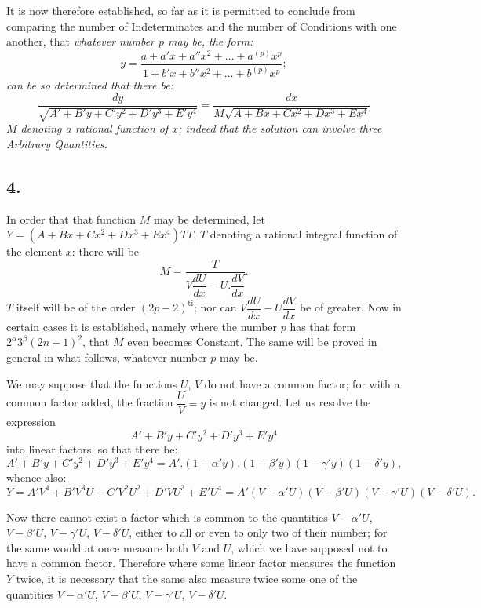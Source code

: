 \documentclass{article}
\begin{document}
It is now therefore established, so far as it is permitted to conclude from comparing the number of Indeterminates and the number of Conditions with one another, that \emph{whatever number $p$ may be, the form:}
\[
y=\frac{a+a'x+a''x^{2}+\ldots+a^{(p)}x^{p}}{1+b'x+b''x^{2}+\ldots+b^{(p)}x^{p}};
\]
\emph{can be so determined that there be:}
\[
\frac{dy}{\sqrt{A'+B'y+C'y^{2}+D'y^{3}+E'y^{4}}}=\frac{dx}{M\sqrt{A+Bx+Cx^{2}+Dx^{3}+Ex^{4}}}
\]
\emph{$M$ denoting a rational function of $x$; indeed that the solution can involve three Arbitrary Quantities.}

\subsection*{4.}

In order that that function $M$ may be determined, let $Y=(A+Bx+Cx^{2}+Dx^{3}+Ex^{4})TT$, $T$ denoting a rational integral function of the element $x$: there will be
\[
M=\frac{T}{V\dfrac{dU}{dx}-U.\dfrac{dV}{dx}}.
\]
$T$ itself will be of the order $(2p-2)^{\mathrm{ti}}$; nor can $V\dfrac{dU}{dx}-U\dfrac{dV}{dx}$ be of greater. Now in certain cases it is established, namely where the number $p$ has that form $2^{\alpha}3^{\beta}(2n+1)^{2}$, that $M$ even becomes Constant. The same will be proved in general in what follows, whatever number $p$ may be.

We may suppose that the functions $U$, $V$ do not have a common factor; for with a common factor added, the fraction $\dfrac{U}{V}=y$ is not changed. Let us resolve the expression
\[
A'+B'y+C'y^{2}+D'y^{3}+E'y^{4}
\]
into linear factors, so that there be:
\[
A'+B'y+C'y^{2}+D'y^{3}+E'y^{4}=A'.(1-\alpha'y).(1-\beta'y)(1-\gamma'y)(1-\delta'y),
\]
whence also:
\[
Y=A'V^{4}+B'V^{3}U+C'V^{2}U^{2}+D'VU^{3}+E'U^{4}=A'(V-\alpha'U)(V-\beta'U)(V-\gamma'U)(V-\delta'U).
\]


Now there cannot exist a factor which is common to the quantities $V-\alpha'U$, $V-\beta'U$, $V-\gamma'U$, $V-\delta'U$, either to all or even to only two of their number; for the same would at once measure both $V$ and $U$, which we have supposed not to have a common factor. Therefore where some linear factor measures the function $Y$ twice, it is necessary that the same also measure twice some one of the quantities $V-\alpha'U$, $V-\beta'U$, $V-\gamma'U$, $V-\delta'U$.
\end{document}
